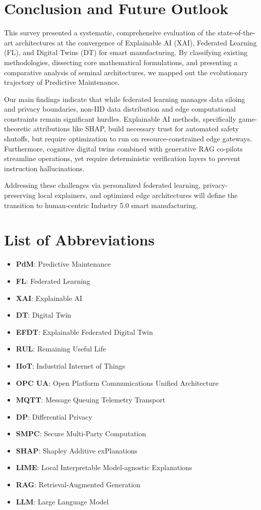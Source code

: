 \documentclass[journal,10pt,compsoc]{IEEEtran}
\begin{document}
\section{Conclusion and Future Outlook}
\label{sec:conclusion}
This survey presented a systematic, comprehensive evaluation of the state-of-the-art architectures at the convergence of Explainable AI (XAI), Federated Learning (FL), and Digital Twins (DT) for smart manufacturing. By classifying existing methodologies, dissecting core mathematical formulations, and presenting a comparative analysis of seminal architectures, we mapped out the evolutionary trajectory of Predictive Maintenance. 

Our main findings indicate that while federated learning manages data siloing and privacy boundaries, non-IID data distribution and edge computational constraints remain significant hurdles. Explainable AI methods, specifically game-theoretic attributions like SHAP, build necessary trust for automated safety shutoffs, but require optimization to run on resource-constrained edge gateways. Furthermore, cognitive digital twins combined with generative RAG co-pilots streamline operations, yet require deterministic verification layers to prevent instruction hallucinations.

Addressing these challenges via personalized federated learning, privacy-preserving local explainers, and optimized edge architectures will define the transition to human-centric Industry 5.0 smart manufacturing.

\section*{List of Abbreviations}
\begin{itemize}
    \item \textbf{PdM}: Predictive Maintenance
    \item \textbf{FL}: Federated Learning
    \item \textbf{XAI}: Explainable AI
    \item \textbf{DT}: Digital Twin
    \item \textbf{EFDT}: Explainable Federated Digital Twin
    \item \textbf{RUL}: Remaining Useful Life
    \item \textbf{IIoT}: Industrial Internet of Things
    \item \textbf{OPC UA}: Open Platform Communications Unified Architecture
    \item \textbf{MQTT}: Message Queuing Telemetry Transport
    \item \textbf{DP}: Differential Privacy
    \item \textbf{SMPC}: Secure Multi-Party Computation
    \item \textbf{SHAP}: Shapley Additive exPlanations
    \item \textbf{LIME}: Local Interpretable Model-agnostic Explanations
    \item \textbf{RAG}: Retrieval-Augmented Generation
    \item \textbf{LLM}: Large Language Model
\end{itemize}
\end{document}
